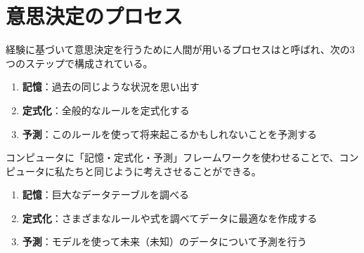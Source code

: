 \documentclass[../../../topic_machine-learning]{subfiles}
\begin{document}
\sectionline
\section{意思決定のプロセス}

経験に基づいて意思決定を行うために人間が用いるプロセスはと呼ばれ、次の3つのステップで構成されている。

\begin{enumerate}
  \item \textbf{記憶}：過去の同じような状況を思い出す
  \item \textbf{定式化}：全般的なルールを定式化する
  \item \textbf{予測}：このルールを使って将来起こるかもしれないことを予測する
\end{enumerate}

コンピュータに「記憶・定式化・予測」フレームワークを使わせることで、コンピュータに私たちと同じように考えさせることができる。

\begin{enumerate}
  \item \textbf{記憶}：巨大なデータテーブルを調べる
  \item \textbf{定式化}：さまざまなルールや式を調べてデータに最適なを作成する
  \item \textbf{予測}：モデルを使って未来（未知）のデータについて予測を行う
\end{enumerate}
\end{document}
